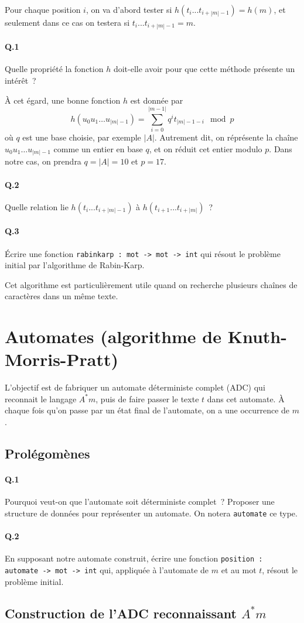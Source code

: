 \documentclass[10pt,a4paper]{article}
\begin{document}
Pour chaque position $i$, on va d'abord tester si $h(t_i...t_{i+|m|-1}) = h(m)$, et
seulement dans ce cas on testera si $t_i...t_{i+|m|-1} = m$.
\paragraph{Q.1} Quelle propriété la fonction $h$ doit-elle avoir pour que cette 
méthode présente un intérêt~?

À cet égard, une bonne fonction $h$ est donnée par
\[h(u_0u_1\dots u_{|m|-1}) = \sum_{i=0}^{|m-1|} q^i t_{|m|-1-i} \mod p\]
où $q$ est une base choisie, par exemple $|A|$. Autrement dit, on réprésente la
chaîne $u_0u_1\dots u_{|m|-1}$ comme un entier en base $q$, et on réduit cet 
entier modulo $p$. Dans notre cas, on prendra $q=|A|=10$ et $p=17$.
\paragraph{Q.2} Quelle relation lie $h(t_i...t_{i+|m|-1})$ 
à $h(t_{i+1}...t_{i+|m|})$~?
\paragraph{Q.3} Écrire une fonction \texttt{rabinkarp : mot -> mot -> int} qui 
résout le problème initial par l'algorithme de Rabin-Karp.

Cet algorithme est particulièrement utile quand on recherche plusieurs chaînes 
de caractères dans un même texte.
\section{Automates (algorithme de Knuth-Morris-Pratt)}
L'objectif est de fabriquer un automate déterministe complet (ADC) qui reconnait
le langage $A^* m$, puis de faire passer le texte $t$ dans cet automate. À 
chaque fois qu'on passe par un état final de l'automate, on a une occurrence de 
$m$.
\subsection{Prolégomènes}
\paragraph{Q.1} Pourquoi veut-on que l'automate soit déterministe complet~? 
Proposer une structure de données pour représenter un automate. On notera 
\texttt{automate} ce type.
\paragraph{Q.2} En supposant notre automate construit, écrire une fonction 
\texttt{position : automate -> mot -> int} qui, appliquée à l'automate de $m$ 
et au mot $t$, résout le problème initial.
\subsection{Construction de l'ADC reconnaissant $A^* m$}
\end{document}
